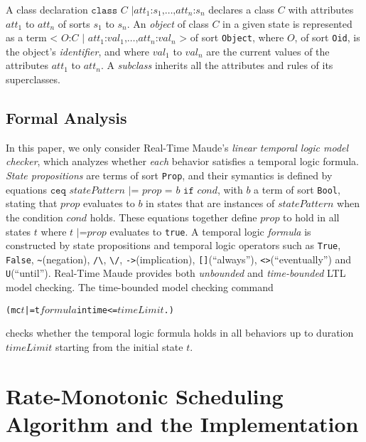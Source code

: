 \documentclass{llncs}
\begin{document}
A class declaration $\texttt{class }C\texttt{ |
}att_1\texttt{:}s_1\texttt{,}\ldots\texttt{,}att_n\texttt{:}s_n$
declares a class $C$ with attributes $att_1$ to $att_n$ of sorts $s_1$
to $s_n$. An \emph{object} of class $C$ in a given state is
represented as a term $\texttt{< } O\texttt{:} C \texttt{ | }
att_1\texttt{:}val_1\texttt{,} \ldots
\texttt{,}att_n\texttt{:}val_n\texttt{ >}$ of sort \verb|Object|,
where $O$, of sort \verb|Oid|, is the object's \emph{identifier}, and
where $val_1$ to $val_n$ are the current values of the attributes
$att_1$ to $att_n$. A \emph{subclass} inherits all the attributes and
rules of its superclasses.

\subsection{Formal Analysis}
In this paper, we only consider Real-Time Maude's \emph{linear
  temporal logic model checker}, which analyzes whether \emph{each}
behavior satisfies a temporal logic formula. \emph{State propositions}
are terms of sort \verb|Prop|, and their symantics is defined by
equations $\texttt{ceq } statePattern \texttt{ |= } prop \texttt{ = }
b \texttt{ if } cond$, with $b$ a term of sort \verb|Bool|, stating
that $prop$ evaluates to $b$ in states that are instances of
$statePattern$ when the condition $cond$ holds. These equations
together define $prop$ to hold in all states $t$ where $t \texttt{ |=
} prop$ evaluates to \verb|true|. A temporal logic \emph{formula} is
constructed by state propositions and temporal logic operators such as
\verb|True|, \verb|False|, \verb|~|(negation), \verb|/\|, \verb|\/|,
\verb|->|(implication), \verb|[]|(``always''),
\verb|<>|(``eventually'') and \verb|U|(``until''). Real-Time Maude
provides both \emph{unbounded} and \emph{time-bounded} LTL model
checking. The time-bounded model checking command
\begin{alltt}
  (mc \(t\) |=t \(formula\) in time <= \(timeLimit\) .)
\end{alltt}
checks whether the temporal logic formula holds in all behaviors up to
duration $timeLimit$ starting from the initial state $t$.

\section{Rate-Monotonic Scheduling Algorithm and the Implementation}
\end{document}
